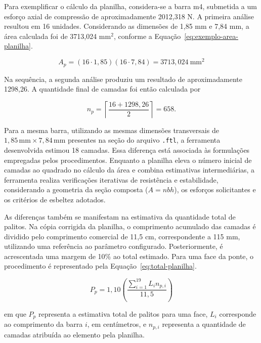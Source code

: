 Para exemplificar o cálculo da planilha, considera-se a barra m4, submetida a um esforço axial de compressão de aproximadamente 2012,318 N. A primeira análise resultou em 16 unidades. Considerando as dimensões de 1,85 mm e 7,84 mm, a área calculada foi de 3713,024 mm$^2$, conforme a Equação~\ref{eq:exemplo-area-planilha}.

\begin{equation}
    A_p =
    (16 \cdot 1,85)(16 \cdot 7,84)
    = 3713,024\ \mathrm{mm}^2
    \label{eq:exemplo-area-planilha}
\end{equation}

Na sequência, a segunda análise produziu um resultado de aproximadamente 1298,26. A quantidade final de camadas foi então calculada por

\begin{equation}
    n_p =
    \left\lceil
    \frac{16+1298,26}{2}
    \right\rceil
    = 658.
    \label{eq:exemplo-camadas-planilha}
\end{equation}

Para a mesma barra, utilizando as mesmas dimensões transversais de \(1,85\,\mathrm{mm}\times 7,84\,\mathrm{mm}\) presentes na seção do arquivo \texttt{.ftl}, a ferramenta desenvolvida estimou 18 camadas. Essa diferença está associada às formulações empregadas pelos procedimentos. Enquanto a planilha eleva o número inicial de camadas ao quadrado no cálculo da área e combina estimativas intermediárias, a ferramenta realiza verificações iterativas de resistência e estabilidade, considerando a geometria da seção composta (\(A = nbh\)), os esforços solicitantes e os critérios de esbeltez adotados.

As diferenças também se manifestam na estimativa da quantidade total de palitos. Na cópia corrigida da planilha, o comprimento acumulado das camadas é dividido pelo comprimento comercial de 11,5 cm, correspondente a 115 mm, utilizando uma referência ao parâmetro configurado. Posteriormente, é acrescentada uma margem de 10\% ao total estimado. Para uma face da ponte, o procedimento é representado pela Equação~\ref{eq:total-planilha}.

\begin{equation}
    P_p =
    1,10
    \left(
        \frac{\displaystyle\sum_{i=1}^{19}L_i n_{p,i}}
        {11,5}
    \right)
    \label{eq:total-planilha}
\end{equation}

\noindent em que $P_p$ representa a estimativa total de palitos para uma face, $L_i$ corresponde ao comprimento da barra $i$, em centímetros, e $n_{p,i}$ representa a quantidade de camadas atribuída ao elemento pela planilha.

